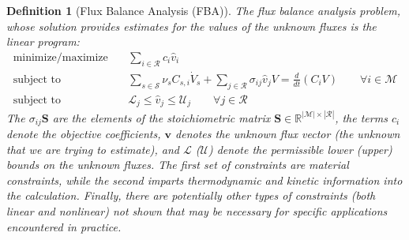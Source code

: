 \documentclass{article}[11pt]
\newtheorem{defn}{Definition}
\def\R{\mathbb{R}}
\begin{document}
\begin{mdframed}
\begin{defn}[Flux Balance Analysis (FBA)]\label{defn-fba-concentration}
The flux balance analysis problem, whose solution provides estimates for the values of the unknown fluxes is the linear program: 
\begin{eqnarray*}
\text{minimize/maximize}~& & \sum_{i\in\mathcal{R}}c_{i}\hat{v}_{i}\\
\text{subject to} & & \sum_{s\in\mathcal{S}}\nu_{s}C_{s,i}\dot{V}_{s} + \sum_{j\in\mathcal{R}}\sigma_{ij}\hat{v}_{j}V = \frac{d}{dt}\left(C_{i}V\right)\qquad\forall{i\in\mathcal{M}}\\
\text{subject to} & & \mathcal{L}_{j}\leq\hat{v}_{j}\leq\mathcal{U}_{j}\qquad\forall{j\in\mathcal{R}}
\end{eqnarray*}
The $\sigma_{ij}\mathbf{S}$ are the elements of the  stoichiometric matrix $\mathbf{S}\in\R^{|\mathcal{M}|\times|\mathcal{R}|}$, 
the terms $c_{i}$ denote the objective coefficients, 
$\mathbf{v}$ denotes the unknown flux vector (the unknown that we are trying to estimate), and 
$\mathcal{L}$ ($\mathcal{U}$) denote the permissible lower (upper) bounds on the unknown fluxes. 
The first set of constraints are material constraints, 
while the second imparts thermodynamic and kinetic information into the calculation. 
Finally, there are potentially other types of constraints (both linear and nonlinear) not shown 
that may be necessary for specific applications encountered in practice.
\end{defn}
\end{mdframed}





\end{document}
